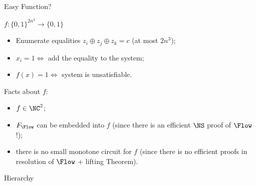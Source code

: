 \begin{frame}{Easy Function?}

    $f\colon \{0, 1\}^{2 n^3} \to \{0, 1\}$

    \begin{itemize}
        \item Enumerate equalities $z_i \oplus z_j \oplus z_k = c$ (at most $2 n^3$);
        \item $x_i = 1 \Leftrightarrow$ add the equality to the system;
        \item $f(x) = 1 \Leftrightarrow$ system is unsatisfiable.
    \end{itemize}

    \pause
    Facts about $f$:
    \begin{itemize}
        \item $f \in \NC^2$;
        \item $F_{\Flow}$ can be embedded into $f$ (since there is an efficient $\NS$ proof of $\Flow$!);
        \item there is no small monotone circuit for $f$ (since there is no efficient proofs in
            resolution of $\Flow$ + lifting Theorem).
    \end{itemize}
\end{frame}

\begin{frame}{Hierarchy}

    
    
\end{frame}